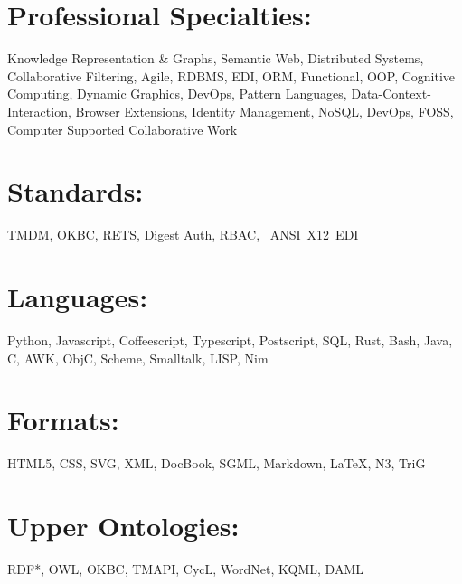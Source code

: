 \documentclass[line,margin,hidelinks]{res}
\begin{document}
\begin{resume}
\section{Professional Specialties:}
\begin{par}
Knowledge Representation \& Graphs,
Semantic Web,
Distributed Systems,
Collaborative Filtering,
Agile,
RDBMS,
EDI,
ORM,
Functional,
OOP,
Cognitive Computing,
Dynamic Graphics,
DevOps,
Pattern Languages,
Data-Context-Interaction,
Browser Extensions,
Identity Management,
NoSQL,
DevOps,
FOSS,
Computer Supported Collaborative Work
\end{par}

\section{Standards:}
\begin{par}
TMDM,
OKBC,
RETS,
Digest Auth,
RBAC,
~ANSI~X12~EDI
\end{par}

\section{Languages:}
\begin{par}
  Python, Javascript, Coffeescript, Typescript, Postscript, SQL, Rust, Bash,
  Java, C, AWK, ObjC, Scheme, Smalltalk, LISP, Nim
\end{par}

\section{Formats:}
\begin{par}
  HTML5, CSS, SVG, XML, DocBook, SGML, Markdown, \LaTeX, N3, TriG
\end{par}

\section{\footnotesize{Upper Ontologies:}}
\begin{par}
  RDF*, OWL, OKBC, TMAPI, CycL, WordNet, KQML, DAML
\end{par}


% 



\end{resume}
\end{document}

